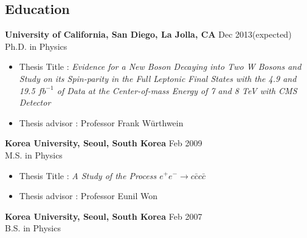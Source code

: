 \documentclass[margin]{res}
\begin{document}
 

 
\address{ Mayer Hall Addition 5531 \\ 9500 Gilman Drive \\ La Jolla, CA 92093 USA  \\
          \href{mailto:jay013@physics.ucsd.edu}{jay013@physics.ucsd.edu} }


\begin{resume} 


\section{Education} 
\textbf{University of California, San Diego, La Jolla, CA} \hfill  Dec 2013(expected) \\
Ph.D. in Physics \\
 \begin{itemize} \itemsep -2pt  %
 \item Thesis Title : \textit{Evidence for a New Boson Decaying into Two W Bosons
 and Study on its Spin-parity in the Full Leptonic Final States with the  
 4.9 and 19.5 $fb^{-1}$ of Data at the Center-of-mass Energy of 7 and 8 TeV with CMS Detector}
 \item Thesis advisor : Professor Frank W\"urthwein   
 \end{itemize}

\textbf{Korea University, Seoul, South Korea} \hfill Feb 2009 \\
M.S. in Physics 
 \begin{itemize} \itemsep -2pt  %
 \item Thesis Title : \textit{A Study of the Process $e^+e^- \rightarrow c\bar{c}c\bar{c}$} 
 \item Thesis advisor : Professor Eunil Won  
 \end{itemize}
\textbf{Korea University, Seoul, South Korea} \hfill Feb 2007 \\
B.S. in Physics \\


\end{resume}
\end{document}
